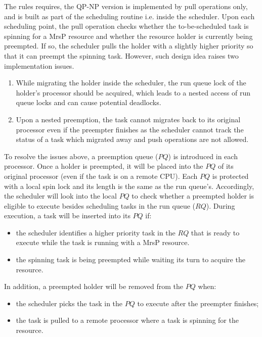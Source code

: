 \documentclass{report}
\begin{document}
The rules requires, the QP-NP version is implemented by pull operations only, and is built as part of the scheduling routine i.e. inside the scheduler. Upon each scheduling point, the pull operation checks whether the to-be-scheduled task is spinning for a MrsP resource and whether the resource holder is currently being preempted. If so, the scheduler pulls the holder with a slightly higher priority so that it can preempt the spinning task. However, such design idea raises two implementation issues.
\begin{enumerate}
\renewcommand{\labelenumi}{(\theenumi)}
\item While migrating the holder inside the scheduler, the run queue lock of the holder's processor should be acquired, which leads to a nested access of run queue locks and can cause potential deadlocks.
\item Upon a nested preemption, the task cannot migrates back to its original processor even if the preempter finishes as the scheduler cannot track the status of a task which migrated away and push operations are not allowed.
\end{enumerate}

To resolve the issues above, a preemption queue ($PQ$) is introduced in each processor. Once a holder is preempted, it will be placed into the $PQ$ of its original processor (even if the task is on a remote CPU). Each $PQ$ is protected with a local spin lock and its length is the same as the run queue's. Accordingly, the scheduler will look into the local $PQ$ to check whether a preempted holder is eligible to execute besides scheduling tasks in the run queue ($RQ$). During execution, a task will be inserted into its $PQ$ if:
\begin{itemize}
\item the scheduler identifies a higher priority task in the $RQ$ that is ready to execute while the task is running with a MrsP resource.
\item the spinning task is being preempted while waiting its turn to acquire the resource.
\end{itemize}
In addition, a preempted holder will be removed from the $PQ$ when:
\begin{itemize}
\item the scheduler picks the task in the $PQ$ to execute after the preempter finishes;
\item the task is pulled to a remote processor where a task is spinning for the resource.
\end{itemize}
\end{document}
